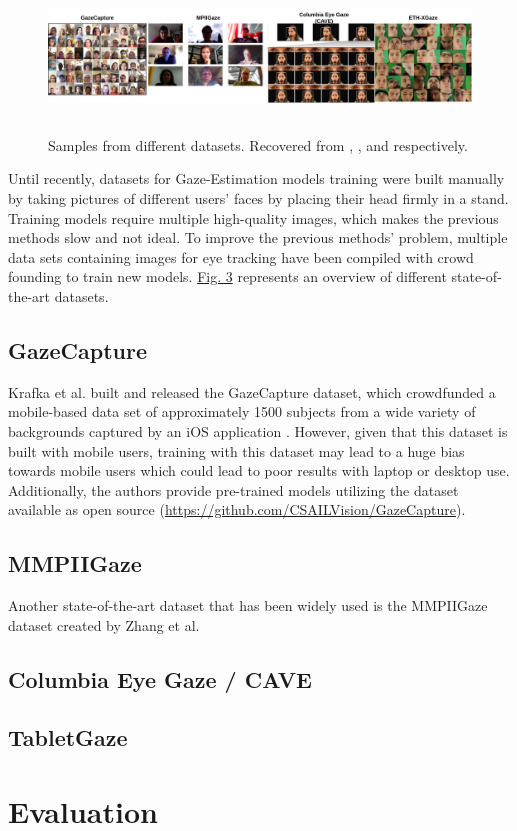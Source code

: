 \documentclass[letterpaper, 10 pt, conference]{ieeeconf}
\begin{document}
\begin{figure}
    \centering
    \includegraphics[width=\textwidth,height=4cm]{figures/datasets.png}
    \caption{Samples from different datasets. Recovered from \cite{GazeCapture}, \cite{GazeEstimationInTheWild}, \cite{CAVE_0324} and \cite{Zhang2020ETHXGaze} respectively. }
    \label{Datasets}
 \end{figure}

Until recently, datasets for Gaze-Estimation models training were built manually by taking pictures of different users' faces by placing their head firmly in a stand. Training models require multiple high-quality images, which makes the previous methods slow and not ideal.
To improve the previous methods' problem, multiple data sets containing images for eye tracking have been compiled with crowd founding to train new models.
\hyperref[Datasets]{Fig. 3} represents an overview of different state-of-the-art datasets.

\subsection*{GazeCapture}



Krafka et al. built and released the GazeCapture dataset, which crowdfunded a mobile-based data set of approximately 1500 subjects from a wide variety of backgrounds captured by an iOS application \cite{GazeCapture}. However, given that this dataset is built with mobile users, training with this dataset may lead to a huge bias towards mobile users which could lead to poor results with laptop or desktop use.
Additionally, the authors provide pre-trained models utilizing the dataset available as open source (\url{https://github.com/CSAILVision/GazeCapture}).
\subsection*{MMPIIGaze}
Another state-of-the-art dataset that has been widely used is the MMPIIGaze dataset created by Zhang et al. \cite{GazeEstimationInTheWild}


\subsection*{Columbia Eye Gaze / CAVE}

\subsection*{TabletGaze}

\section{Evaluation}


\printbibliography[title={References}]

\end{document}
